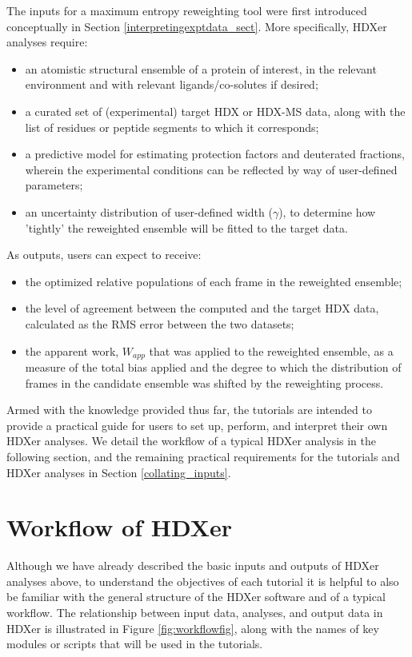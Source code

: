 \documentclass[9pt,tutorial,ASAPversion]{livecoms}
\begin{document}
The inputs for a maximum entropy reweighting tool were first introduced conceptually in Section \ref{interpretingexptdata_sect}. More specifically, HDXer analyses require:
\begin{itemize}
    \item an atomistic structural ensemble of a protein of interest, in the relevant environment and with relevant ligands/co-solutes if desired;
    \item a curated set of (experimental) target HDX or HDX-MS data, along with the list of residues or peptide segments to which it corresponds;
    \item a predictive model for estimating protection factors and deuterated fractions, wherein the experimental conditions can be reflected by way of user-defined parameters;
    \item an uncertainty distribution of user-defined width ($\gamma$), to determine how 'tightly' the reweighted ensemble will be fitted to the target data.
\end{itemize}
As outputs, users can expect to receive:
\begin{itemize}
    \item the optimized relative populations of each frame in the reweighted ensemble;
    \item the level of agreement between the computed and the target HDX data, calculated as the RMS error between the two datasets;
    \item the apparent work, $W_{app}$ that was applied to the reweighted ensemble, as a measure of the total bias applied and the degree to which the distribution of frames in the candidate ensemble was shifted by the reweighting process.
\end{itemize}
Armed with the knowledge provided thus far, the tutorials are intended to provide a practical guide for users to set up, perform, and interpret their own HDXer analyses.
We detail the workflow of a typical HDXer analysis in the following section, and the remaining practical requirements for the tutorials and HDXer analyses in Section \ref{collating_inputs}.

\section{Workflow of HDXer}
Although we have already described the basic inputs and outputs of HDXer analyses above, to understand the objectives of each tutorial it is helpful to also be familiar with the general structure of the HDXer software and of a typical workflow.
The relationship between input data, analyses, and output data in HDXer is illustrated in Figure \ref{fig:workflowfig}, along with the names of key modules or scripts that will be used in the tutorials.
\end{document}
